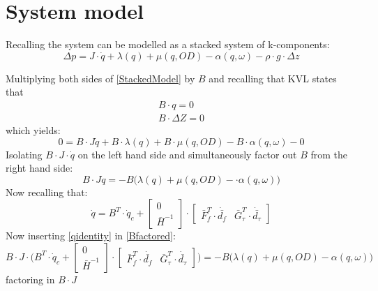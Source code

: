 \section{System model}
Recalling the system can be modelled as a stacked system of k-components:
\begin{equation} \label{StackedModel}
	\Delta{p} = J\cdot \dot{q} + \lambda(q)+\mu(q,OD)-\alpha(q,\omega)-\rho\cdot g \cdot \Delta z
\end{equation}

Multiplying both sides of \cref{StackedModel} by $B$ and recalling that KVL states that 
\begin{equation*}
\begin{split}
		B\cdot q = 0 \\ 
	B\cdot \Delta Z =0
\end{split}
\end{equation*}
which yields:
\begin{equation}
	0 = B\cdot J \dot{q} + B\cdot \lambda(q)+B \cdot \mu(q,OD) - B\cdot \alpha(q,\omega) -0 
\end{equation}
Isolating $B\cdot J \cdot \dot{q}$ on the left hand side and simultaneously factor out $B$ from the right hand side: 
\begin{equation} \label{Bfactored}
	B\cdot J \dot{q} = -B \Big(\lambda(q)+\mu(q,OD) -\cdot \alpha(q,\omega)\Big)
\end{equation}
Now recalling that:
\begin{equation} \label{qidentity}
	\dot{q}=B^T \cdot \dot{q}_{c}+\begin{bmatrix} 
	
		0\\ 
		\bar{H}^{-1}
	\end{bmatrix}
\cdot \begin{bmatrix}
	\bar{F}_{f}^{T}\cdot \dot{\bar{d_{f}}} & \bar{G}_{\tau}^{T}\cdot \dot{\bar{d_{\tau}}} 
\end{bmatrix}
\end{equation}
Now inserting \cref{qidentity} in \cref{Bfactored}:
\begin{equation}
	B \cdot J \cdot \Big(B^T \cdot \dot{q}_{c}+\begin{bmatrix} 
		0\\ 
		\bar{H}^{-1}
	\end{bmatrix}
	\cdot \begin{bmatrix}
		\bar{F}_{f}^{T}\cdot \dot{\bar{d_{f}}} & \bar{G}_{\tau}^{T}\cdot \dot{\bar{d_{\tau}}}\end{bmatrix} \Big) = -B \Big(\lambda(q)+\mu(q,OD) - \alpha(q,\omega)\Big)		
\end{equation}
factoring in $B\cdot J$


